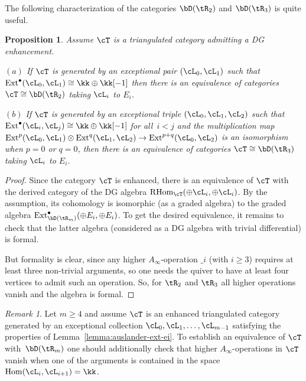 \documentclass[11pt]{amsart}
\DeclareMathOperator{\Hom}{\mathrm{Hom}}
\DeclareMathOperator{\Ext}{\mathrm{Ext}}
\DeclareMathOperator{\RHom}{\mathrm{RHom}}
\theoremstyle{plain}
\newtheorem{proposition}[theorem]{Proposition}
\theoremstyle{definition}
\theoremstyle{remark}
\newtheorem{remark}[theorem]{Remark}
\begin{document}
The following characterization of the categories $\bD(\tR_2)$ and $\bD(\tR_3)$ is quite useful.

\begin{proposition}\label{proposition:rm-equivalence}
Assume $\cT$ is a triangulated category admitting a DG enhancement.

\noindent$(a)$
If $\cT$ is generated by an exceptional pair $(\cL_0,\cL_1)$ such that $\Ext^\bullet(\cL_0,\cL_1) \cong \kk \oplus \kk[-1]$ then there is an equivalence of categories $\cT \cong \bD(\tR_2)$ taking $\cL_i$ to $E_i$.

\noindent$(b)$
If $\cT$ is generated by an exceptional triple $(\cL_0,\cL_1,\cL_2)$ 
such that $\Ext^\bullet(\cL_i,\cL_j) \cong \kk \oplus \kk[-1]$ for all~\mbox{$i < j$}
and the multiplication map $\Ext^p(\cL_0,\cL_1) \otimes \Ext^q(\cL_1,\cL_2) \to  \Ext^{p+q}(\cL_0,\cL_2)$ 
is an isomorphism when $p = 0$ or $q = 0$, then there is an equivalence of categories $\cT \cong \bD(\tR_3)$ taking $\cL_i$ to $E_i$.
\end{proposition}
\begin{proof}
Since the category $\cT$ is enhanced, there is an equivalence of $\cT$ with the derived category of the DG algebra $\RHom_\cT(\oplus \cL_i,\oplus \cL_i)$.
By the assumption, its cohomology is isomorphic (as a graded algebra) to the graded algebra $\Ext^\bullet_{\bD(\tR_m)}(\oplus E_i, \oplus E_i)$.
To get the desired equivalence, it remains to check that the latter algebra (considered as a DG algebra with trivial differential) is formal.

But formality is clear, since any higher $A_\infty$-operation $\bm_i$ (with $i \ge 3$) requires at least three non-trivial arguments, 
so one needs the quiver to have at least four vertices to admit such an operation.
So, for $\tR_2$ and $\tR_3$ all higher operations vanish and the algebra is formal.
\end{proof}

\begin{remark}
Let $m \ge 4$ and assume $\cT$ is an enhanced triangulated category generated by an exceptional collection $\cL_0,\cL_1,\dots,\cL_{m-1}$ satisfying the properties of Lemma~\ref{lemma:auslander-ext-ei}.
To establish an equivalence of $\cT$ with~$\bD(\tR_m)$ one should additionally check that higher $A_\infty$-operations in $\cT$ vanish when one of the arguments is contained in the space $\Hom(\cL_i,\cL_{i+1}) = \kk$.
\end{remark}
\end{document}
